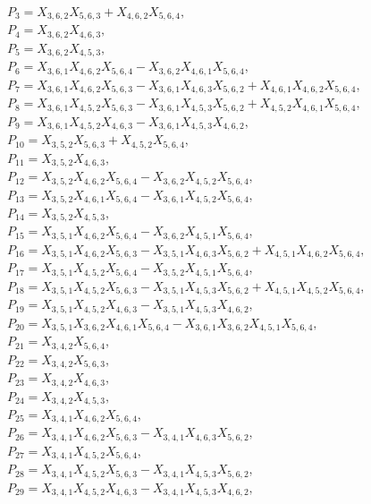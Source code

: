 \documentclass[10pt]{beamer}
\begin{document}
{$P_{3}=X_{3,6,2}X_{5,6,3}+X_{4,6,2}X_{5,6,4},$\\
$P_{4}=X_{3,6,2}X_{4,6,3},$\\
$P_{5}=X_{3,6,2}X_{4,5,3},$\\
$P_{6}=X_{3,6,1}X_{4,6,2}X_{5,6,4}-X_{3,6,2}X_{4,6,1}X_{5,6,4},$\\
$P_{7}=X_{3,6,1}X_{4,6,2}X_{5,6,3}-X_{3,6,1}X_{4,6,3}X_{5,6,2}+X_{4,6,1}X_{4,6,2}X_{5,6,4},$\\
$P_{8}=X_{3,6,1}X_{4,5,2}X_{5,6,3}-X_{3,6,1}X_{4,5,3}X_{5,6,2}+X_{4,5,2}X_{4,6,1}X_{5,6,4},$\\
$P_{9}=X_{3,6,1}X_{4,5,2}X_{4,6,3}-X_{3,6,1}X_{4,5,3}X_{4,6,2},$\\
$P_{10}=X_{3,5,2}X_{5,6,3}+X_{4,5,2}X_{5,6,4},$\\
$P_{11}=X_{3,5,2}X_{4,6,3},$\\
$P_{12}=X_{3,5,2}X_{4,6,2}X_{5,6,4}-X_{3,6,2}X_{4,5,2}X_{5,6,4},$\\
$P_{13}=X_{3,5,2}X_{4,6,1}X_{5,6,4}-X_{3,6,1}X_{4,5,2}X_{5,6,4},$\\
$P_{14}=X_{3,5,2}X_{4,5,3},$\\
$P_{15}=X_{3,5,1}X_{4,6,2}X_{5,6,4}-X_{3,6,2}X_{4,5,1}X_{5,6,4},$\\
$P_{16}=X_{3,5,1}X_{4,6,2}X_{5,6,3}-X_{3,5,1}X_{4,6,3}X_{5,6,2}+X_{4,5,1}X_{4,6,2}X_{5,6,4},$\\
$P_{17}=X_{3,5,1}X_{4,5,2}X_{5,6,4}-X_{3,5,2}X_{4,5,1}X_{5,6,4},$\\
$P_{18}=X_{3,5,1}X_{4,5,2}X_{5,6,3}-X_{3,5,1}X_{4,5,3}X_{5,6,2}+X_{4,5,1}X_{4,5,2}X_{5,6,4},$\\
$P_{19}=X_{3,5,1}X_{4,5,2}X_{4,6,3}-X_{3,5,1}X_{4,5,3}X_{4,6,2},$\\
$P_{20}=X_{3,5,1}X_{3,6,2}X_{4,6,1}X_{5,6,4}-X_{3,6,1}X_{3,6,2}X_{4,5,1}X_{5,6,4},$\\
$P_{21}=X_{3,4,2}X_{5,6,4},$\\
$P_{22}=X_{3,4,2}X_{5,6,3},$\\
$P_{23}=X_{3,4,2}X_{4,6,3},$\\
$P_{24}=X_{3,4,2}X_{4,5,3},$\\
$P_{25}=X_{3,4,1}X_{4,6,2}X_{5,6,4},$\\
$P_{26}=X_{3,4,1}X_{4,6,2}X_{5,6,3}-X_{3,4,1}X_{4,6,3}X_{5,6,2},$\\
$P_{27}=X_{3,4,1}X_{4,5,2}X_{5,6,4},$\\
$P_{28}=X_{3,4,1}X_{4,5,2}X_{5,6,3}-X_{3,4,1}X_{4,5,3}X_{5,6,2},$\\
$P_{29}=X_{3,4,1}X_{4,5,2}X_{4,6,3}-X_{3,4,1}X_{4,5,3}X_{4,6,2},$\\
}
\end{document}
